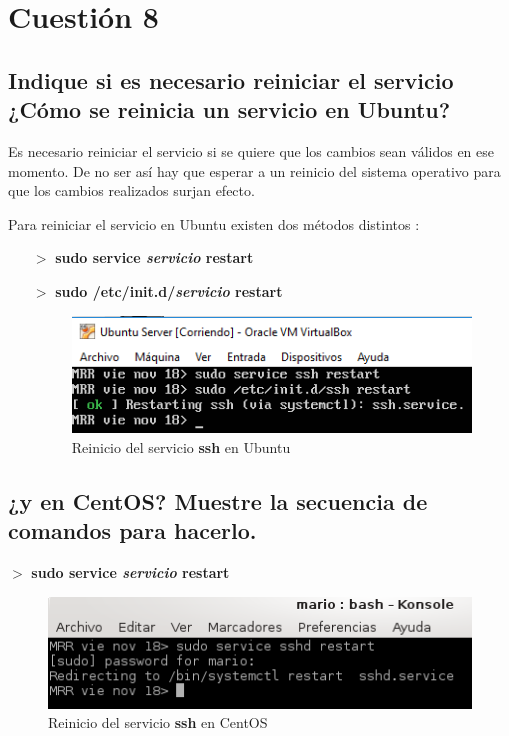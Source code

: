 \newpage

\section{Cuestión 8}
\subsection{Indique si es necesario reiniciar el servicio ¿Cómo se reinicia
	un servicio en Ubuntu?}	

Es necesario reiniciar el servicio si se quiere que los cambios sean válidos
en ese momento. De no ser así hay que esperar a un reinicio del sistema operativo para que los cambios realizados surjan efecto.

Para reiniciar el servicio en Ubuntu existen dos métodos distintos \cite{enlace20}:

\begin{enumerate}
	\item [$>$] \textbf{sudo service \textit{servicio} restart}
	\item [$>$] \textbf{sudo /etc/init.d/\textit{servicio} restart}
	\begin{figure}[H] %
		\centering
		\includegraphics[scale=0.8]{figuras/figura22.png} 
		\caption{Reinicio del servicio \textbf{ssh} en Ubuntu} 
		\label{fig:figura22}
	\end{figure}
\end{enumerate}
\subsection{¿y en CentOS? Muestre la secuencia de comandos
	para hacerlo.}	

$ > $ \textbf{sudo service \textit{servicio} restart} \cite{enlace21}
\begin{figure}[H] %
	\centering
	\includegraphics[scale=0.8]{figuras/figura23.png} 
	\caption{Reinicio del servicio \textbf{ssh} en CentOS} 
	\label{fig:figura23}
\end{figure}


